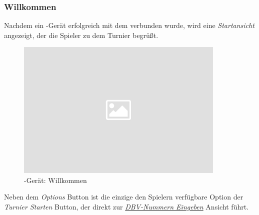 \subsubsection{Willkommen}\label{cli/welcome}

\noindent
Nachdem ein \cli-Gerät erfolgreich mit dem \bb \ser verbunden wurde,
wird eine \textit{Startansicht} angezeigt, der die Spieler zu dem
Turnier begrüßt.\\[.1cm]

\noindent
\begin{figure}[ht]
	\centering
  \includegraphics[width=10cm]{pictures/placeholder.png}
	\caption{\cli-Gerät: Willkommen}
	\label{pic/cli_0_welcome}
\end{figure}

\noindent
Neben dem \textit{Options} Button ist die einzige den Spielern verfügbare Option der \textit{Turnier Starten} Button, der direkt zur \hyperref[cli/dbv]{\textit{DBV-Nummern Eingeben}} Ansicht führt.

